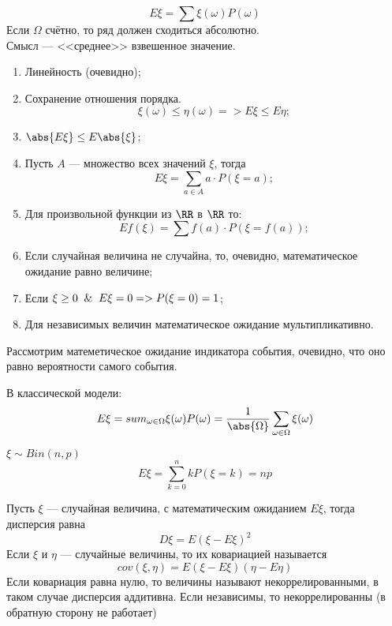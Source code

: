 \begin{definition}
    \[E\xi = \sum\xi(\omega)P(\omega)\]
    Если $\Omega$ счётно, то ряд должен сходиться абсолютно.\\ 
    Смысл --- <<среднее>> взвешенное значение.
    \begin{theorem}
        \phantom{asdf}
        \begin{enumerate}
            \item Линейность (очевидно);
            \item Сохранение отношения порядка. \[\xi(\omega) \leq \eta(\omega) => E\xi \leq E\eta;\]
            \item $\abs{E\xi} \leq E\abs{\xi}$;
            \item Пусть $A$ --- множество всех значений $\xi$, тогда \[E\xi = \sum_{a \in A} a \cdot P(\xi=a);\]
            \item Для произвольной функции из $\RR$ в $\RR$ то: \[Ef(\xi) = \sum f(a) \cdot P(\xi=f(a));\]
            \item Если случайная величина не случайна, то, очевидно, математическое ожидание равно величине;
            \item Если $\xi \geq 0 \And E\xi = 0 => P(\xi=0)=1$;
            \item Для независимых величин математическое ожидание мультипликативно.
        \end{enumerate}
    \end{theorem}
\end{definition}

\vspace*{10pt}
Рассмотрим матеметическое ожидание индикатора события, очевидно, что оно равно вероятности самого события.

В классической модели:
    \[E\xi = sum_{\omega \in \Omega} \xi(\omega)P(\omega) = \frac{1}{\abs{\Omega}}\sum_{\omega \in \Omega}\xi(\omega)\]

$\xi \sim Bin(n, p)$
    \[E\xi = \sum_{k=0}^n kP(\xi=k) = np\]


\begin{definition}
    Пусть $\xi$ --- случайная величина, с математическим ожиданием $E\xi$, тогда дисперсия равна 
        \[D\xi = E(\xi - E\xi)^2\]
    Если $\xi$ и $\eta$ --- случайные величины, то их ковариацией называется 
        \[cov(\xi, \eta) = E(\xi-E\xi)(\eta-E\eta)\]
    Если ковариация равна нулю, то величины называют некоррелированными, в таком случае дисперсия аддитивна. Если независимы, 
    то некоррелированны (в обратную сторону не работает)
\end{definition}

